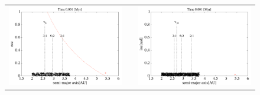 \documentclass[11pt,a4paper,oneside,onecolumn]{jreport}
\begin{document}
\begin{figure}[H]
\begin{tabular}{ccc}
\begin{minipage}[t]{0.45\hsize}
\centering
\includegraphics[width=8cm]{./image/asteroid_ecc_1kyr.pdf}
\end{minipage} &
\begin{minipage}[t]{0.1\hsize}
\end{minipage} &
\begin{minipage}[t]{0.45\hsize}
\centering
\includegraphics[width=8cm]{./image/asteroid_inc_1kyr.pdf}
\end{minipage}\\
%
\end{tabular}
\caption{\label{fig:asteroid_ecc_inc_1kyr}}
\end{figure}
\end{document}
